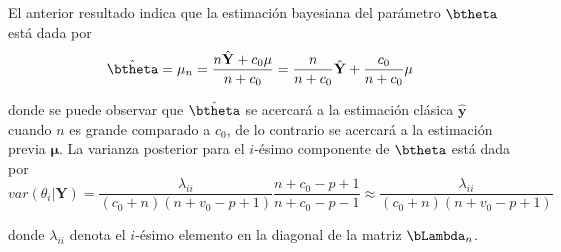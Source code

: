 \documentclass[10pt,openright]{book}\usepackage[]{graphicx}\usepackage[]{color}
\begin{document}
El anterior resultado indica que la estimaci\'on bayesiana del par\'ametro $\btheta$ est\'a dada por 
\begin{equation*}
\hat{\btheta}=\mathbf{\mu}_n=\dfrac{n\hat{\mathbf{Y}}+c_0\mathbf{\mu}}{n+c_0}=\dfrac{n}{n+c_0}\hat{\mathbf{Y}}+\dfrac{c_0}{n+c_0}\mathbf{\mu}
\end{equation*}

donde se puede observar que $\hat{\btheta}$ se acercar\'a a la estimaci\'on cl\'asica $\hat{\mathbf{y}}$ cuando $n$ es grande comparado a $c_0$, de lo contrario se acercar\'a a la estimaci\'on previa $\mathbf{\mu}$. La varianza posterior para el $i$-\'esimo componente de $\btheta$ est\'a dada por 
\begin{equation*}
var(\theta_i|\mathbf{Y})=\dfrac{\lambda_{ii}}{(c_0+n)(n+v_0-p+1)}\dfrac{n+c_0-p+1}{n+c_0-p-1}\approx\dfrac{\lambda_{ii}}{(c_0+n)(n+v_0-p+1)}
\end{equation*}

donde $\lambda_{ii}$ denota el $i$-\'esimo elemento en la diagonal de la matriz $\bLambda_n$.
\end{document}
